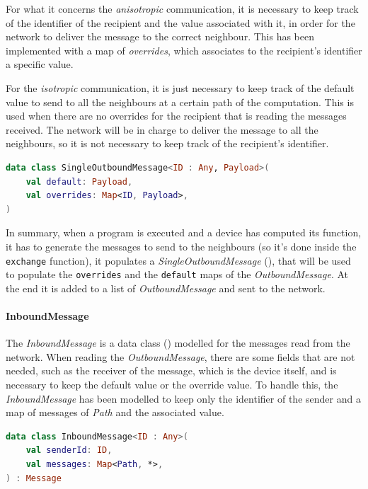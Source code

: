 For what it concerns the \emph{anisotropic} communication, it is necessary to keep track of the identifier of the recipient
and the value associated with it, in order for the network to deliver the message to the correct neighbour.
This has been implemented with a map of \emph{overrides}, which associates to the recipient's identifier a specific value.

For the \emph{isotropic} communication, it is just necessary to keep track of the default value to send to all the neighbours
at a certain path of the computation.
This is used when there are no overrides for the recipient that is reading the messages received.
The network will be in charge to deliver the message to all the neighbours, so it is not necessary to keep track of the recipient's identifier.

\begin{lstlisting}[language=kt,label={lst:single}, caption={Single outbound message data class.}]
data class SingleOutboundMessage<ID : Any, Payload>(
    val default: Payload,
    val overrides: Map<ID, Payload>,
)
\end{lstlisting}

In summary, when a program is executed and a device has computed its function, it has to generate the messages to send to
the neighbours (so it's done inside the \texttt{exchange} function), it populates a \emph{SingleOutboundMessage} (),
that will be used to populate the \texttt{overrides} and the \texttt{default} maps of the \emph{OutboundMessage}.
At the end it is added to a list of \emph{OutboundMessage} and sent to the network.

\paragraph{InboundMessage}
The \emph{InboundMessage} is a data class () modelled for the messages read from the network.
When reading the \emph{OutboundMessage}, there are some fields that are not needed, such as the receiver of the message,
which is the device itself, and is necessary to keep the default value or the override value.
To handle this, the \emph{InboundMessage} has been modelled to keep only the identifier of the sender and
a map of messages of \emph{Path} and the associated value.

\begin{lstlisting}[language=kt,label={lst:inbound}, caption={Inbound message data class.}]
data class InboundMessage<ID : Any>(
    val senderId: ID,
    val messages: Map<Path, *>,
) : Message
\end{lstlisting}

